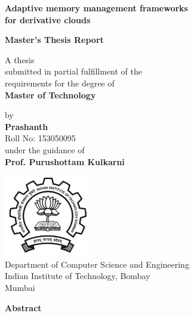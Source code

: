 \documentclass[11pt,a4paper]{report}
\newcommand{\putiitblogo}{\includegraphics[width=10em]{iitb-black}}
\begin{document}
  \begin{titlepage}    
    \begin{center}
   
      \huge \textbf{Adaptive memory management frameworks \\for derivative clouds}  \\
      \vspace{4em}
      
      \large \textbf{Master's Thesis Report} \\
      \vspace{5em}
      
      \normalsize A thesis \\submitted in partial fulfillment of the \\requirements for the degree of \\
      \vspace{1em}      
      \large \textbf{Master of Technology} \\
      \vspace{5em}
      
      \normalsize by \\
      \vspace{1em}      
      \large \textbf{Prashanth} \\ 
      \vspace{0.5em}
      \normalsize Roll No: 153050095 \\
      
      \vspace{5em}
      \normalsize under the guidance of \\
      \vspace{0.5em}      
      \large \textbf{Prof. Purushottam Kulkarni} \\
      \vspace{3em}
      
      \putiitblogo \\
      \Large 
      Department of Computer Science and Engineering \\
      Indian Institute of Technology, Bombay \\
      Mumbai
      
    \end{center}
  \end{titlepage} 
  
  \begin{center}
    \huge \textbf{Abstract}
  \end{center}
  \vspace*{3em}
  \normalsize 
    
\end{document}
